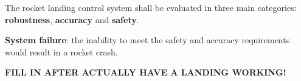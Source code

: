 The rocket landing control system shall be evaluated in three main categories: \textbf{robustness}, \textbf{accuracy} and \textbf{safety}.

\begin{center}
    \textbf{System failure}: the inability to meet the safety and accuracy requirements would result in a rocket crash.
\end{center}


\textbf{FILL IN AFTER ACTUALLY HAVE A LANDING WORKING!}